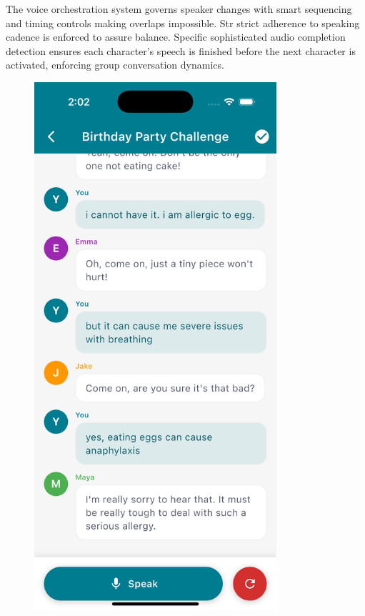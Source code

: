 \documentclass[MScCS]{uccthesis}
\begin{document}
The voice orchestration system governs speaker changes with smart sequencing and timing controls making overlaps impossible. Str strict adherence to speaking cadence is enforced to assure balance. Specific sophisticated audio completion detection ensures each character's speech is finished before the next character is activated, enforcing group conversation dynamics.




\begin{figure}[htbp]
    \centering
    \begin{minipage}[b]{0.45\textwidth}
        \centering
        \includegraphics[width=0.8\textwidth,height=0.45\textheight,keepaspectratio]{Figures/group_training.png} 

\end{minipage}
\end{figure}
\end{document}

